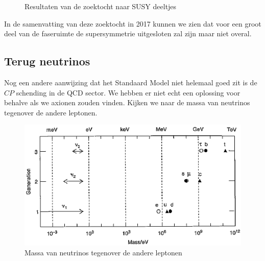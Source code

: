 \documentclass[../main.tex]{subfiles}
\begin{document}
\begin{figure}[ht]
    \hfill
    \caption{Resultaten van de zoektocht naar SUSY deeltjes}
    \label{fig:physics_beyond_the_standard_model/zoektocht_susy_deeltjes}
\end{figure}

In de samenvatting van deze zoektocht in 2017 kunnen we zien dat voor een groot deel van de faseruimte de supersymmetrie uitgesloten zal zijn maar niet overal.

\subsection{Terug neutrinos}%
\label{sub:terug_neutrinos}

Nog een andere aanwijzing dat het Standaard Model niet helemaal goed zit is de $CP$ schending in de QCD sector. We hebben er niet echt een oplossing voor behalve als we axionen zouden vinden. Kijken we naar de massa van neutrinos tegenover de andere leptonen.

\begin{figure}[h]
    \centering
    \includegraphics[width=0.5\linewidth]{physics_beyond_the_standard_model/neutrino_massa.png}
    \caption{Massa van neutrinos tegenover de andere leptonen}%
    \label{fig:physics_beyond_the_standard_model/neutrino_massa}
\end{figure}
\end{document}
